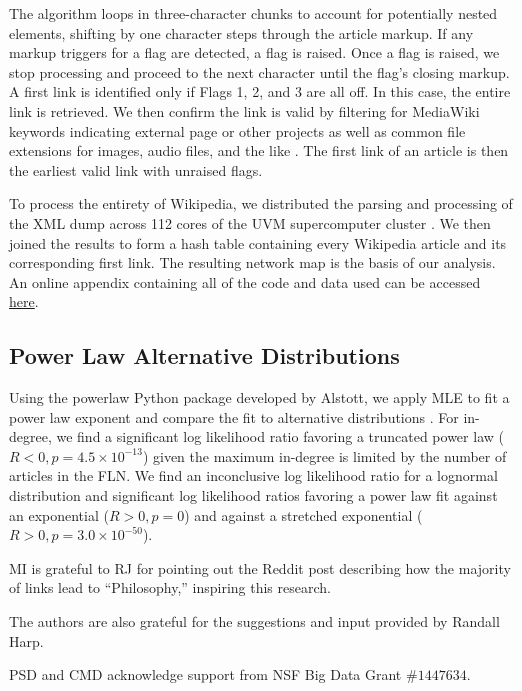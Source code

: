 \documentclass[pre,twocolumn,twoside,superscriptaddress,floatfix]{revtex4-1}
\begin{document}
{The algorithm loops in three-character chunks to account for potentially nested elements, 
shifting by one character steps through the article markup.
If any markup triggers for a flag are detected, a flag is raised. 
Once a flag is raised, we stop processing and proceed to the next character
until the flag's closing markup.
A first link is identified only if Flags 1, 2, and 3 are all off.
In this case, the entire link is retrieved. 
We then confirm the link is valid by filtering for MediaWiki keywords indicating external page or other projects
as well as common file extensions for 
images, audio files, and the like 
\cite{media_wiki_templates}.
The first link of an article is then the earliest valid link with unraised flags.

To process the entirety of Wikipedia, we distributed the parsing and processing of the XML dump
across 112 cores of the UVM supercomputer cluster
\cite{vacc}.
We then joined the results to form a hash table containing every Wikipedia article and its corresponding
first link. The resulting network map is the basis of our analysis.
An online appendix containing all of the code and data used can be accessed \href{http://compstorylab.org/share/papers/ibrahim2016a/index.html}{here}.

\subsection{Power Law Alternative Distributions}
\label{power_law_comp}

Using the powerlaw Python package developed by Alstott, we apply MLE to fit a power law exponent and compare the fit to alternative distributions
\cite{clauset2009power, alstott2014powerlaw}.
For in-degree, we find a significant log likelihood ratio favoring a  truncated power law ($R < 0, p=4.5\times10^{-13}$) given the maximum in-degree is limited by the number of articles in the FLN. We find an inconclusive log likelihood ratio for a lognormal distribution and significant log likelihood ratios favoring a power law fit against an exponential ($R  > 0, p=0$) and against a stretched exponential ($R > 0, p = 3.0\times10^{-50}$). 

\acknowledgments
MI is grateful to RJ for pointing out the Reddit post 
\cite{reddit}
describing how the majority of links lead to ``Philosophy,'' inspiring this research.

The authors are also grateful for the suggestions and input provided by Randall Harp.

PSD and CMD acknowledge support from NSF Big Data Grant $\#1447634$.

}
\end{document}
